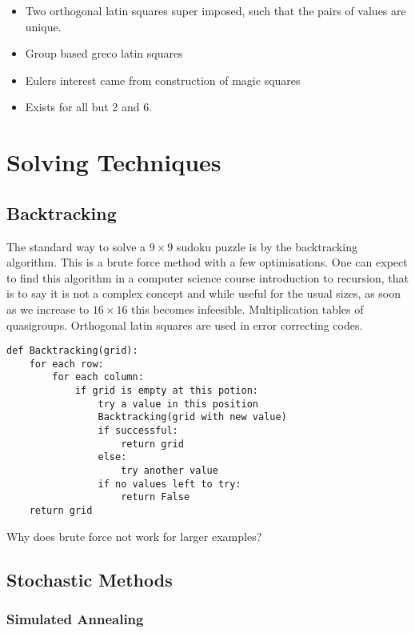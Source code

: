 \documentclass[a4paper,12pt]{article}
\begin{document}
		\begin{itemize}
		\item{Two orthogonal latin squares super imposed, such that the pairs of values are unique.}
		\item{Group based greco latin squares}
		\item{Eulers interest came from construction of magic squares}
		\item{Exists for all but 2 and 6.}
		\end{itemize}

\section{Solving Techniques}
	\subsection{Backtracking}
		
		The standard way to solve a $9 \times 9$ sudoku puzzle is by the backtracking algorithm. 
		This is a brute force method with a few optimisations.
		One can expect to find this algorithm in a computer science course introduction to recursion, that is to say it is not a complex concept 
		and while useful for the usual sizes, as soon as we increase to $16 \times 16$ this becomes infeesible.
		Multiplication tables of quasigroups.
		Orthogonal latin squares are used in error correcting codes.
		
		\begin{lstlisting}[caption=Backtracking]
def Backtracking(grid):
    for each row:
        for each column:
            if grid is empty at this potion:
                try a value in this position
                Backtracking(grid with new value)
                if successful:
                    return grid
                else:
                    try another value
                if no values left to try:
                    return False
    return grid						
		\end{lstlisting}
		
		Why does brute force not work for larger examples?

	\subsection{Stochastic Methods}
		\subsubsection{Simulated Annealing} 
\end{document}
